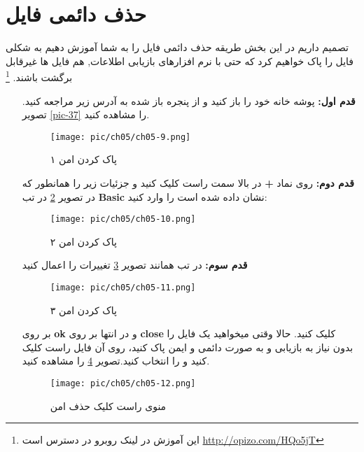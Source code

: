 \section{حذف دائمی فایل}\label{se-42}
تصمیم داریم در این بخش طریقه حذف دائمی فایل را به شما آموزش دهیم به شکلی فایل را پاک خواهیم کرد که حتی با نرم افزارهای بازیابی اطلاعات, هم فایل ها غیرقابل برگشت باشند.
\footnote{این آموزش در لینک روبرو در دسترس است
\href{http://www.linuxfedora.ir/shred-t184.html\#p199}{http://opizo.com/HQo5jT}}
\begin{enumerate}
	\item[\textbf{قدم اول:}] 
	پوشه خانه خود را باز کنید و از پنجره باز شده به آدرس  زیر مراجعه کنید. تصویر 
	\ref{pic-37}
	را مشاهده کنید.
	
\begin{figure}[H]%
	\caption{پاک کردن امن ۱}
	\begin{center}
		\texttt{[image: pic/ch05/ch05-9.png]}
	\end{center}
	\label{pic-45}
\end{figure}
\item[\textbf{قدم دوم:}] 
روی نماد
\textbf{+}	
در بالا سمت راست کلیک کنید و جزئیات زیر را همانطور که در تصویر 
\ref{pic-46}
 در تب 
\textbf{Basic} 
نشان داده شده است را وارد کنید:
\begin{figure}[H]%
	\caption{پاک کردن امن ۲}
	\begin{center}
		\texttt{[image: pic/ch05/ch05-10.png]}
	\end{center}
	\label{pic-46}
\end{figure}
\item[\textbf{قدم سوم:}] 
در تب
\textbf{}
همانند تصویر
\ref{pic-47}
تغییرات را اعمال کنید
\begin{figure}[H]%
	\caption{پاک کردن امن ۳}
	\begin{center}
		\texttt{[image: pic/ch05/ch05-11.png]}
	\end{center}
	\label{pic-47}
\end{figure}
بر روی 
\textbf{ok}
و در انتها بر روی 
\textbf{close}
کلیک کنید.
حالا وقتی میخواهید یک فایل را بدون نیاز به بازیابی و به صورت دائمی و ایمن پاک کنید، روی آن فایل راست کلیک کنید و 
\textbf{}
 را انتخاب کنید.تصویر
 \ref{pic-48}
 را مشاهده کنید.
\begin{figure}[H]%
	\caption{منوی راست کلیک حذف امن}
	\begin{center}
		\texttt{[image: pic/ch05/ch05-12.png]}
	\end{center}
	\label{pic-48}
\end{figure} 
\end{enumerate}
